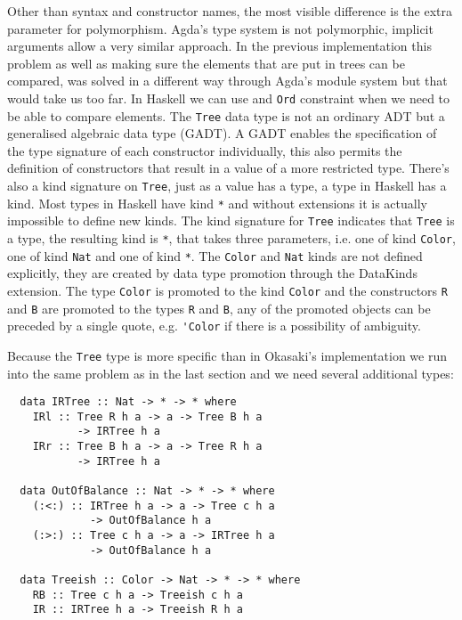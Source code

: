 \documentclass[journal, retainorgcmds]{IEEEtran}
\newcommand{\ihask}[1]{\texttt{#1}}
\begin{document}
Other than syntax and constructor names, the most visible difference is the
extra parameter for polymorphism.
Agda's type system is not polymorphic, implicit arguments allow a very
similar approach.
In the previous implementation this problem as well as making sure the elements
that are put in trees can be compared, was solved in a different way
through Agda's module system but that would take us too far.
In Haskell we can use and \ihask{Ord} constraint when we need to be able to
compare elements.
The \ihask{Tree} data type is not an ordinary ADT but a generalised algebraic
data type (GADT).
A GADT enables the specification of the type signature of each constructor
individually, this also permits the definition of constructors that result in a
value of a more restricted type.
There's also a kind \cite{kind} signature on \ihask{Tree}, just as a value has
a type, a type in Haskell has a kind.
Most types in Haskell have kind \ihask{*} and without extensions it is actually
impossible to define new kinds.
The kind signature for \ihask{Tree} indicates that \ihask{Tree} is a type, the
resulting kind is \ihask{*}, that takes three parameters, i.e. one of kind
\ihask{Color}, one of kind \ihask{Nat} and one of kind \ihask{*}.
The \ihask{Color} and \ihask{Nat} kinds are not defined explicitly, they are
created by data type promotion \cite{dtprom} through the DataKinds extension.
The type \ihask{Color} is promoted to the kind \ihask{Color} and the
constructors \ihask{R} and \ihask{B} are promoted to the types \ihask{R} and
\ihask{B}, any of the promoted objects can be preceded by a single quote, e.g.
\verb|'Color| if there is a possibility of ambiguity.

Because the \ihask{Tree} type is more specific than in Okasaki's implementation
we run into the same problem as in the last section and we need several
additional types:

\begin{verbatim}
  data IRTree :: Nat -> * -> * where
    IRl :: Tree R h a -> a -> Tree B h a
           -> IRTree h a
    IRr :: Tree B h a -> a -> Tree R h a
           -> IRTree h a

  data OutOfBalance :: Nat -> * -> * where
    (:<:) :: IRTree h a -> a -> Tree c h a
             -> OutOfBalance h a
    (:>:) :: Tree c h a -> a -> IRTree h a
             -> OutOfBalance h a

  data Treeish :: Color -> Nat -> * -> * where
    RB :: Tree c h a -> Treeish c h a
    IR :: IRTree h a -> Treeish R h a
\end{verbatim}
\end{document}
